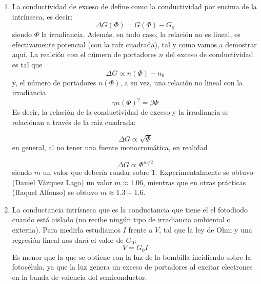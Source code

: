 \begin{enumerate}[label=\alph*)]
	\item La conductividad de exceso de define como la conductividad por encima de la intrínseca, es decir:
	      \begin{equation*}
		      \Delta G (\Phi) = G(\Phi)  - G_0
	      \end{equation*}
	siendo $\Phi$ la irradiancia. Además, en todo caso, la relación no es lineal, es efectivamente potencial (con la raíz cuadrada), tal y como vamos a demostrar aquí. La realción con el número de portadores $n$ del exceso de conductividad es tal que 
	      \begin{equation*}
		      \Delta G \propto n(\Phi) - n_0
	      \end{equation*}
	      y, el número de portadores $n(\Phi)$, a su vez, una relación no lineal con la irradiancia
	      \begin{equation*}
		      \gamma n(\Phi)^2 = \beta  \Phi
	      \end{equation*}
	      Es decir, la relación de la conductividad de exceso y la irradiancia se relaciónan a través de la raiz cuadrada:

	      \begin{equation*}
		      \Delta G \propto \sqrt{\Phi}
	      \end{equation*}
	      en general, al no tener una fuente monocromática, en realidad

	      \begin{equation*}
		      \Delta G \propto \Phi^{m/2}
	      \end{equation*}
	      siendo $m$ un valor que debería rondar sobre 1. Experimentalmente se obtuvo (Daniel Vázquez Lago) un valor $m\approx 1.06$, mientras que en otras prácticas (Raquel Alfonso) se obtuvo $m\approx 1.3-1.6$.

	\item La conductancia intrísneca que es la conductancia que tiene el el fotodiodo cuando está aislado (no recibe ningún tipo de irradiancia ambiental o externa). Para medirla estudiamos $I$ frente a $V$, tal que la ley de Ohm y una regresión lineal nos dará el valor de $G_0$:
	      \begin{equation*}
		      V = G_0 I
	      \end{equation*}
	      Es menor que la que se obtiene con la luz de la bombilla incidiendo sobre la fotocélula, ya que la luz genera un exceso de portadores al excitar electrones en la banda de valencia del semiconductor.
\end{enumerate}

